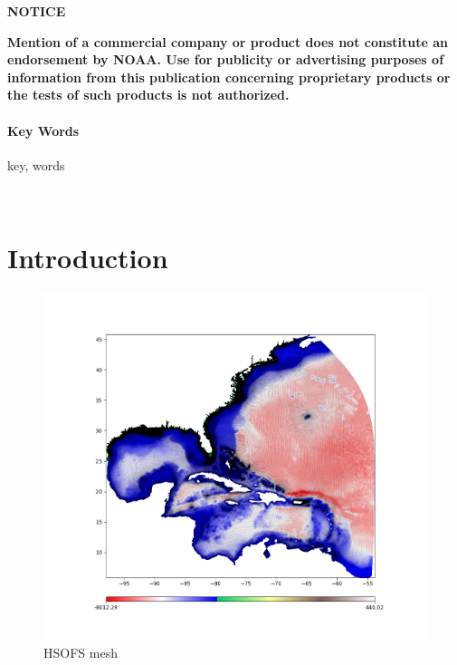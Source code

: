\documentclass[12pt,english]{article}
\begin{document}
\newpage{}

\vspace*{\fill}

\begin{center}
\textbf{\large{NOTICE}}
\end{center}

\vspace*{\bigskipamount}

\noindent \textbf{Mention of a commercial company or product does not constitute an endorsement by NOAA. Use for publicity or advertising purposes of information from this publication concerning proprietary products or the tests of such products is not authorized.}

\vspace*{\fill}

\newpage{}

\tableofcontents{}

\listoffigures

\newpage{}

\begin{abstract}
\lipsum[1] \cite{Taguchi2014}
\end{abstract}

\paragraph{Key Words}

key, words

\newpage ~\newpage{}

\setcounter{page}{1}

\section{Introduction}

\lipsum[1] \cite{Egbert2002}

\lipsum[2-4]

\begin{figure}
    \includegraphics[width=\textwidth, keepaspectratio]{images/hsofs_mesh.png}
    \caption{HSOFS mesh}
    \label{fig:hsofs_mesh}
\end{figure}
\end{document}
